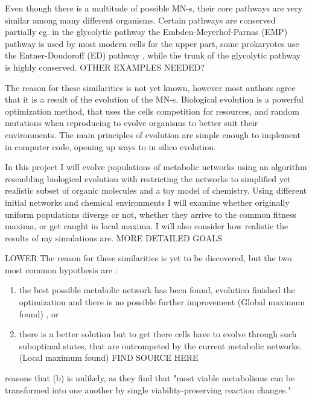 \documentclass[10pt,a4paper]{article}
\begin{document}
	Even though there is a multitude of possible MN-s, their core pathways are very similar among many different organisms. Certain pathways are conserved partially  eg. in the glycolytic pathway the Embden-Meyerhof-Parnas (EMP) pathway \cite{EMPpathway} is used by most modern cells for the upper part,  some prokaryotes  use the Entner-Doudoroff (ED) pathway \cite{EDpathway}, while the trunk of the glycolytic pathway is highly conserved. OTHER EXAMPLES NEEDED? 

	The reason for these similarities is not yet known, however most authors agree that it is a result of the evolution of the MN-s. 
	 Biological evolution is a powerful optimization method, that uses the cells competition for resources, and random mutations when reproducing to evolve organisms to better suit their environments. The main principles of evolution are simple enough to implement in computer code, opening up ways to in silico evolution. 



	In this project I will evolve populations of metabolic networks using an algorithm resembling biological evolution with restricting the networks to simplified yet realistic subset of organic molecules and a toy model of chemistry. Using different initial networks and chemical environments I will examine whether originally uniform populations diverge or not, whether they arrive to the common fitness maxima, or get caught in local maxima. I will also consider how realistic the results of my simulations are.  MORE DETAILED GOALS



	LOWER The reason for these similarities is yet to be discovered, but the two most common hypothesis  are : 
	\begin{enumerate}[label=(\alph*)]
	\item the best possible metabolic network has been found, evolution finished the optimization and there is no possible further improvement (Global maximum found) \cite{theoretical} \cite{latent} \cite{strategy}, or 
	\item there is a better solution but to get there cells have to evolve through such suboptimal states, that are outcompeted by the current metabolic networks. (Local maximum found) FIND SOURCE HERE
	\end{enumerate} 
	 \cite{historical} reasons that (b) is unlikely, as they find that  "most viable metabolisms can be transformed into one another by single viability-preserving reaction changes."  
\end{document}
